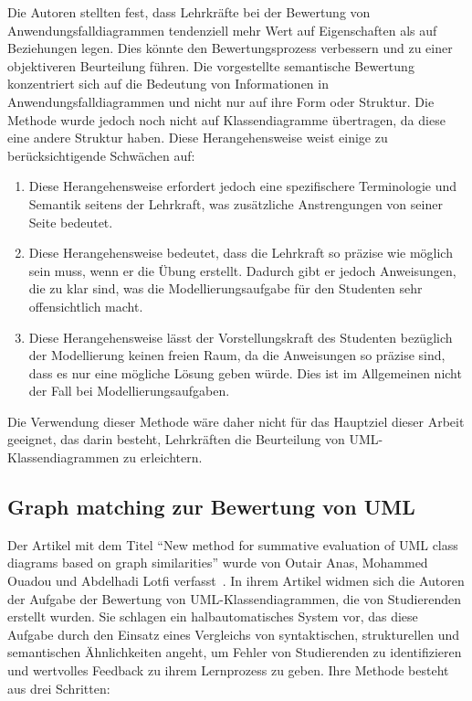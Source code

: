 Die Autoren stellten fest, dass Lehrkräfte bei der Bewertung von Anwendungsfalldiagrammen tendenziell mehr Wert auf
Eigenschaften als auf Beziehungen legen. Dies könnte den Bewertungsprozess verbessern und zu einer objektiveren
Beurteilung führen. Die vorgestellte semantische Bewertung konzentriert sich auf die Bedeutung von Informationen in
Anwendungsfalldiagrammen und nicht nur auf ihre Form oder Struktur. Die Methode wurde jedoch noch nicht auf
Klassendiagramme übertragen, da diese eine andere Struktur haben. Diese Herangehensweise weist einige zu
berücksichtigende Schwächen auf:

\begin{enumerate}
    \item Diese Herangehensweise erfordert jedoch eine spezifischere Terminologie und Semantik seitens der Lehrkraft, was
    zusätzliche Anstrengungen von seiner Seite bedeutet.
    \item Diese Herangehensweise bedeutet, dass die Lehrkraft so präzise wie möglich sein muss, wenn er die Übung
    erstellt. Dadurch gibt er jedoch Anweisungen, die zu klar sind, was die Modellierungsaufgabe für den Studenten sehr
    offensichtlich macht.
    \item Diese Herangehensweise lässt der Vorstellungskraft des Studenten bezüglich der Modellierung keinen freien
    Raum, da die Anweisungen so präzise sind, dass es nur eine mögliche Lösung geben würde. Dies ist im Allgemeinen
    nicht der Fall bei Modellierungsaufgaben.
\end{enumerate}

Die Verwendung dieser Methode wäre daher nicht für das Hauptziel dieser Arbeit geeignet, das darin besteht, Lehrkräften
die Beurteilung von UML-Klassendiagrammen zu erleichtern.


\subsection{Graph matching zur Bewertung von UML}

Der Artikel mit dem Titel ``New method for summative evaluation of UML class diagrams based on graph similarities''
wurde von Outair Anas, Mohammed Ouadou und Abdelhadi Lotfi verfasst~\cite{anas2021new}. In ihrem Artikel widmen sich die
Autoren der Aufgabe der Bewertung von UML-Klassendiagrammen, die von Studierenden erstellt wurden. Sie
schlagen ein halbautomatisches System vor, das diese Aufgabe durch den Einsatz eines Vergleichs von syntaktischen,
strukturellen und semantischen Ähnlichkeiten angeht, um Fehler von Studierenden zu identifizieren und wertvolles
Feedback zu ihrem Lernprozess zu geben. Ihre Methode besteht aus drei Schritten:

